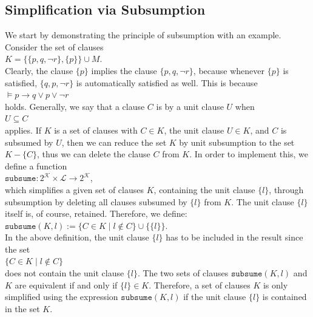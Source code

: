 \subsection{Simplification via Subsumption}
We start by demonstrating the principle of subsumption with an example.
Consider the set of clauses
\\[0.2cm]
\hspace*{1.3cm} $K = \bigl\{ \{p, q, \neg r\}, \{p\} \bigr\} \cup M$. \\[0.2cm]
Clearly, the clause $\{p\}$ implies the clause $\{p, q, \neg r\}$, because whenever
$\{p\}$ is satisfied, $\{q, p, \neg r\}$ is automatically satisfied as well. This is because
\\[0.2cm]
\hspace*{1.3cm} $\models p \rightarrow q \vee p \vee \neg r$
\\[0.2cm]
holds. Generally, we say that a clause $C$
is  by a unit clause $U$ when
\\[0.2cm]
\hspace*{1.3cm} $U \subseteq C$ \\[0.2cm]
applies. If $K$ is a set of clauses with $C \in K$, the unit clause $U \in K$, and
$C$ is subsumed by $U$, then we can reduce the set $K$ by unit subsumption to the set $K - \{ C \}$,
thus we can delete the clause $C$ from $K$.  In order to implement this, we define a function
\\[0.2cm]
\hspace*{1.3cm}
$\texttt{subsume}: 2^\mathcal{K} \times \mathcal{L} \rightarrow 2^\mathcal{K}$,
\\[0.2cm]
which simplifies a given set of clauses $K$, containing the unit clause $\{l\}$, through subsumption
by deleting all clauses subsumed by $\{l\}$ from $K$.
The unit clause $\{l\}$ itself is, of course, retained. Therefore, we define:
\\[0.2cm]
\hspace*{1.3cm}
$\texttt{subsume}(K, l) := \bigl\{ C \in K \mid l \not\in C \bigr\} \cup \bigl\{\{l\}\bigr\}$.
\\[0.2cm]
In the above definition, the unit clause $\{l\}$ has to be included in the result since the set
\\[0.2cm]
\hspace*{1.3cm}
$\bigl\{ C \in K \mid l \not\in C \bigr\}$
\\[0.2cm]
does not contain the unit clause $\{l\}$. The two sets of clauses
$\mathtt{subsume}(K,l)$ and $K$ are equivalent if and only if $\{l\} \in K$.
Therefore, a set of clauses $K$ is only simplified using the expression $\texttt{subsume}(K, l)$ if
the unit clause $\{l\}$ is contained in the set $K$.

